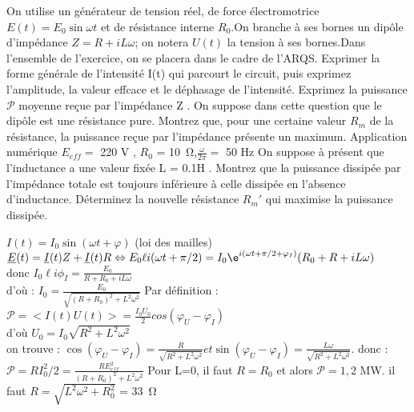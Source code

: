 \begin{Exercise}[title=Adaptation d'impédance]
	On utilise un générateur de tension réel, de force électromotrice $E(t) = E_0 \sin\omega t$  et de résistance interne $R_0$.On branche à ses bornes un dipôle d'impédance	$Z = R + iL\omega$; on notera $U(t)$ la tension à ses bornes.Dans l'ensemble de l'exercice, on se placera dans le cadre de l'ARQS.
	\Question Exprimer la forme générale de l'intensité	I(t) qui parcourt le circuit, puis exprimez l'amplitude, la valeur effcace et le déphasage de l'intensité.
	\Question Exprimez la puissance $\mathcal{P}$ moyenne reçue par l'impédance	Z .
	\Question On suppose dans cette question que le dipôle est une résistance pure. Montrez que, pour une certaine valeur $R_m$ de la résistance, la puissance reçue par l'impédance présente un maximum.
	Application numérique $E_{eff}=$ 220 V , $R_0$ = \SI{10}{\ohm},$\frac{\omega}{2\pi}	=$ 50 Hz
	\Question On suppose à présent que l'inductance a une valeur fixée
	L = 0.1H .	Montrez que la puissance dissipée par l'impédance totale est toujours inférieure à celle dissipée en l'absence d'inductance. Déterminez la nouvelle résistance $R_m'$ qui maximise la puissance dissipée.
\end{Exercise}
\begin{Answer}
	\Question $I(t)=I_0\sin(\omega t+\varphi)$  (loi des mailles)
	$\underline{E}(t)=\underline{I}(t)Z +\underline{I}(t)R \Leftrightarrow E_0 \ell{i(\omega t +\pi/2)} = I_0 \e^{i(\omega t +\pi/2+\varphi_I)}(R_0+R+iL\omega)$\\
	donc $I_0\ell{i\phi_I}=\frac{E_0}{R+R_0+iL\omega}$\\
	d'où : $I_0 = \frac{E_0}{\sqrt{(R+R_0)^2+L^2\omega^2}}$
	\Question Par définition :
	$\mathcal{P} = <I(t)U(t)>= \frac{I_0U_0}{2}cos(\varphi_U -\varphi_I)$\\
	d'où $U_0=I_0\sqrt{R^2+L^2 \omega^2}$ \\
	on trouve : $\cos(\varphi_U-\varphi_I) = \frac{R}{\sqrt{R^2+L^2\omega^2}} et \sin(\varphi_U-\varphi_I)= \frac{L\omega}{\sqrt{R^2+L^2\omega^2}}$.
	 donc : $\mathcal{P}=RI_0^2 /2 = \frac{RE_{eff}^2}{(R+R_0)^2+L^2\omega^2}$
	\Question Pour L=0, il faut $R=R_0$ et alors $\mathcal{P}=1,2$ MW.
	\Question il faut $R= \sqrt{L^2\omega^2+R_0^2} $ = \SI{33}{\ohm}
\end{Answer}
